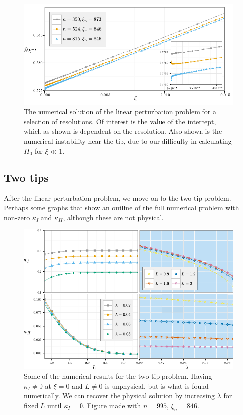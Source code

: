\documentclass{jfm}
\begin{document}
\begin{figure}
 \centerline{
\includegraphics{./../../Graphs/linear-perturbation-plot-edited.pdf}}
  \caption{The numerical solution of the linear perturbation problem for a selection of
           resolutions. Of interest is the value of the intercept, which as shown is dependent
           on the resolution. Also shown is the numerical instability near the tip, due to our 
           difficulty in calculating $H_0$ for $\xi \ll 1$.}
\end{figure}

\subsection{Two tips}
After the linear perturbation problem, we move on to the two tip
problem. Perhaps some graphs that show an outline of the full numerical problem
with non-zero $\kappa_I$ and $\kappa_{II}$, although these are not physical.
\begin{figure}
 \centerline{
\includegraphics{./../../Graphs/KI-KII-edited.pdf}}
  \caption{Some of the numerical results for the two tip problem. Having 
           $\kappa_{I} \neq 0$ at $\xi =0$ and $L \neq 0$ is unphysical, but
           is what is found numerically. We can recover the physical solution
           by increasing $\lambda$ for fixed $L$ until $\kappa_I =0$. Figure 
           made with $n = 995$, $\xi_n = 846$.}
\end{figure}
\end{document}
